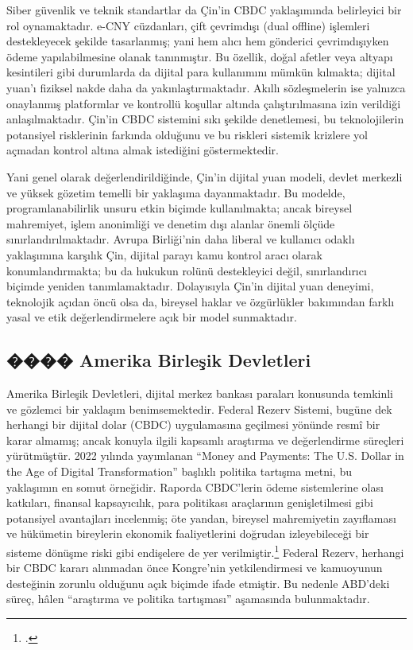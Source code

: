 \documentclass[a4paper,12pt]{article}
\begin{document}
Siber güvenlik ve teknik standartlar da Çin’in CBDC yaklaşımında belirleyici bir rol oynamaktadır. e-CNY cüzdanları, çift çevrimdışı (dual offline) işlemleri destekleyecek şekilde tasarlanmış; yani hem alıcı hem gönderici çevrimdışıyken ödeme yapılabilmesine olanak tanınmıştır. Bu özellik, doğal afetler veya altyapı kesintileri gibi durumlarda da dijital para kullanımını mümkün kılmakta; dijital yuan’ı fiziksel nakde daha da yakınlaştırmaktadır. Akıllı sözleşmelerin ise yalnızca onaylanmış platformlar ve kontrollü koşullar altında çalıştırılmasına izin verildiği anlaşılmaktadır. Çin'in CBDC sistemini sıkı şekilde denetlemesi, bu teknolojilerin potansiyel risklerinin farkında olduğunu ve bu riskleri sistemik krizlere yol açmadan kontrol altına almak istediğini göstermektedir.

Yani genel olarak değerlendirildiğinde, Çin’in dijital yuan modeli, devlet merkezli ve yüksek gözetim temelli bir yaklaşıma dayanmaktadır. Bu modelde, programlanabilirlik unsuru etkin biçimde kullanılmakta; ancak bireysel mahremiyet, işlem anonimliği ve denetim dışı alanlar önemli ölçüde sınırlandırılmaktadır. Avrupa Birliği'nin daha liberal ve kullanıcı odaklı yaklaşımına karşılık Çin, dijital parayı kamu kontrol aracı olarak konumlandırmakta; bu da hukukun rolünü destekleyici değil, sınırlandırıcı biçimde yeniden tanımlamaktadır. Dolayısıyla Çin’in dijital yuan deneyimi, teknolojik açıdan öncü olsa da, bireysel haklar ve özgürlükler bakımından farklı yasal ve etik değerlendirmelere açık bir model sunmaktadır.


\subsection{���� Amerika Birleşik Devletleri}

Amerika Birleşik Devletleri, dijital merkez bankası paraları konusunda temkinli ve gözlemci bir yaklaşım benimsemektedir. Federal Rezerv Sistemi, bugüne dek herhangi bir dijital dolar (CBDC) uygulamasına geçilmesi yönünde resmî bir karar almamış; ancak konuyla ilgili kapsamlı araştırma ve değerlendirme süreçleri yürütmüştür. 2022 yılında yayımlanan “Money and Payments: The U.S. Dollar in the Age of Digital Transformation” başlıklı politika tartışma metni, bu yaklaşımın en somut örneğidir. Raporda CBDC’lerin ödeme sistemlerine olası katkıları, finansal kapsayıcılık, para politikası araçlarının genişletilmesi gibi potansiyel avantajları incelenmiş; öte yandan, bireysel mahremiyetin zayıflaması ve hükümetin bireylerin ekonomik faaliyetlerini doğrudan izleyebileceği bir sisteme dönüşme riski gibi endişelere de yer verilmiştir.\footcite{federalreserve2022money} Federal Rezerv, herhangi bir CBDC kararı alınmadan önce Kongre'nin yetkilendirmesi ve kamuoyunun desteğinin zorunlu olduğunu açık biçimde ifade etmiştir. Bu nedenle ABD’deki süreç, hâlen “araştırma ve politika tartışması” aşamasında bulunmaktadır.
\end{document}

